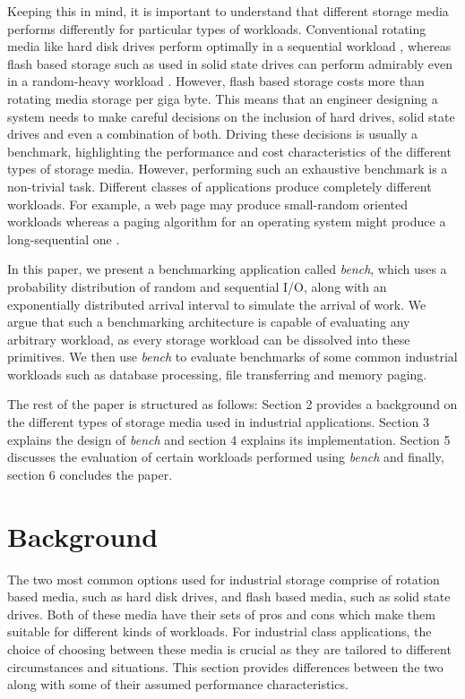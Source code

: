 \documentclass[10pt, author, twocolumn]{article}
\begin{document}
Keeping this in mind, it is important to understand that different storage media performs differently for particular types of workloads. Conventional rotating media like hard disk drives perform optimally in a sequential workload \cite{}, whereas flash based storage such as used in solid state drives can perform admirably even in a random-heavy workload \cite{}. However, flash based storage costs more than rotating media storage per giga byte. This means that an engineer designing a system needs to make careful decisions on the inclusion of hard drives, solid state drives and even a combination of both. Driving these decisions is usually a benchmark, highlighting the performance and cost characteristics of the different types of storage media. However, performing such an exhaustive benchmark is a non-trivial task. Different classes of applications produce completely different workloads. For example, a web page may produce small-random oriented workloads whereas a paging algorithm for an operating system might produce a long-sequential one \cite{}.

In this paper, we present a benchmarking application called \textit{bench}, which uses a probability distribution of random and sequential I/O, along with an exponentially distributed arrival interval to simulate the arrival of work. We argue that such a benchmarking architecture is capable of evaluating any arbitrary workload, as every storage workload can be dissolved into these primitives. We then use \textit{bench} to evaluate benchmarks of some common industrial workloads such as database processing, file transferring and memory paging. 

The rest of the paper is structured as follows: Section 2 provides a background on the different types of storage media used in industrial applications. Section 3 explains the design of \textit{bench} and section 4 explains its implementation. Section 5 discusses the evaluation of certain workloads performed using \textit{bench} and finally, section 6 concludes the paper.

\section{Background}

The two most common options used for industrial storage comprise of rotation based media, such as hard disk drives, and flash based media, such as solid state drives. Both of these media have their sets of pros and cons which make them suitable for different kinds of workloads. For industrial class applications, the choice of choosing between these media is crucial as they are tailored to different circumstances and situations. This section provides differences between the two along with some of their assumed performance characteristics. 
\end{document}

